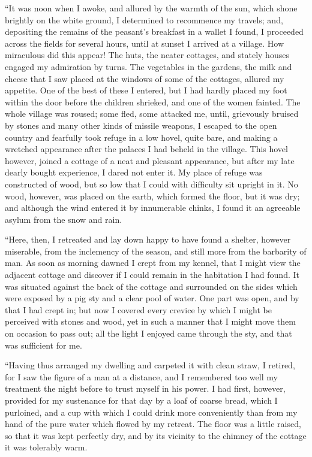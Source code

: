 \documentclass[12pt,openright]{book}
\begin{document}
“It was noon when I awoke, and allured by the warmth of the sun, which shone brightly on the white ground, I determined to recommence my travels; and, depositing the remains of the peasant’s breakfast in a wallet I found, I proceeded across the fields for several hours, until at sunset I arrived at a village. How miraculous did this appear! The huts, the neater cottages, and stately houses engaged my admiration by turns. The vegetables in the gardens, the milk and cheese that I saw placed at the windows of some of the cottages, allured my appetite. One of the best of these I entered, but I had hardly placed my foot within the door before the children shrieked, and one of the women fainted. The whole village was roused; some fled, some attacked me, until, grievously bruised by stones and many other kinds of missile weapons, I escaped to the open country and fearfully took refuge in a low hovel, quite bare, and making a wretched appearance after the palaces I had beheld in the village. This hovel however, joined a cottage of a neat and pleasant appearance, but after my late dearly bought experience, I dared not enter it. My place of refuge was constructed of wood, but so low that I could with difficulty sit upright in it. No wood, however, was placed on the earth, which formed the floor, but it was dry; and although the wind entered it by innumerable chinks, I found it an agreeable asylum from the snow and rain.

“Here, then, I retreated and lay down happy to have found a shelter, however miserable, from the inclemency of the season, and still more from the barbarity of man. As soon as morning dawned I crept from my kennel, that I might view the adjacent cottage and discover if I could remain in the habitation I had found. It was situated against the back of the cottage and surrounded on the sides which were exposed by a pig sty and a clear pool of water. One part was open, and by that I had crept in; but now I covered every crevice by which I might be perceived with stones and wood, yet in such a manner that I might move them on occasion to pass out; all the light I enjoyed came through the sty, and that was sufficient for me.

“Having thus arranged my dwelling and carpeted it with clean straw, I retired, for I saw the figure of a man at a distance, and I remembered too well my treatment the night before to trust myself in his power. I had first, however, provided for my sustenance for that day by a loaf of coarse bread, which I purloined, and a cup with which I could drink more conveniently than from my hand of the pure water which flowed by my retreat. The floor was a little raised, so that it was kept perfectly dry, and by its vicinity to the chimney of the cottage it was tolerably warm.
\end{document}
